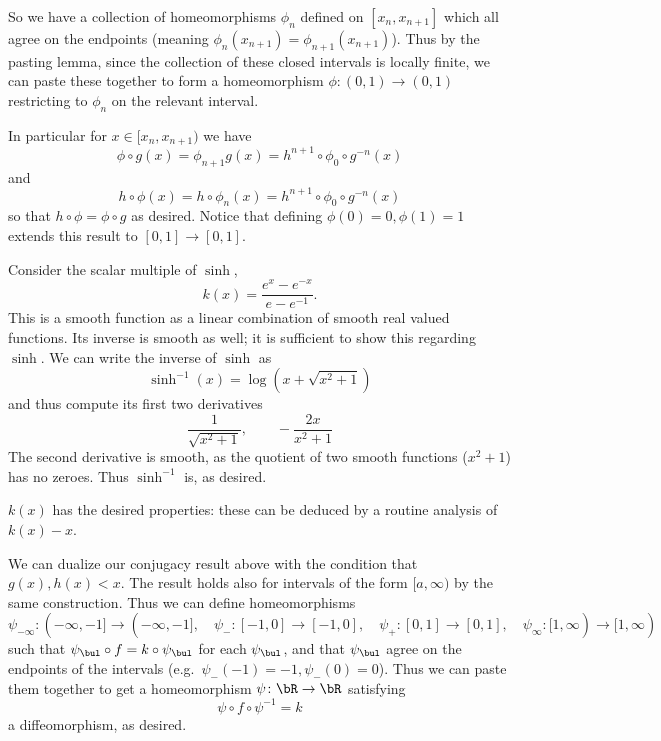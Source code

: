     So we have a collection of homeomorphisms $\phi_n$ defined on $[x_n,x_{n+1}]$ which all agree on the
    endpoints (meaning $\phi_n(x_{n+1})=\phi_{n+1}(x_{n+1})$).
    Thus by the pasting lemma, since the collection of these closed intervals is locally finite, we can
    paste these together to form a homeomorphism $\phi\colon(0,1)\to(0,1)$ restricting to $\phi_n$ on the
    relevant interval.

    In particular for $x\in[x_n,x_{n+1})$ we have
    $$ \phi\circ g(x) = \phi_{n+1} g(x) = h^{n+1}\circ\phi_0\circ g^{-n}(x) $$
    and
    $$ h\circ\phi(x) = h\circ\phi_n(x) = h^{n+1}\circ\phi_0\circ g^{-n}(x) $$
    so that $h\circ\phi=\phi\circ g$ as desired.
    Notice that defining $\phi(0)=0,\phi(1)=1$ extends this result to $[0,1]\to[0,1]$.

    \item Consider the scalar multiple of $\sinh$,
    $$ k(x) = \frac{e^x-e^{-x}}{e-e^{-1}} . $$
    This is a smooth function as a linear combination of smooth real valued functions.
    Its inverse is smooth as well; it is sufficient to show this regarding $\sinh$.
    We can write the inverse of $\sinh$ as
    $$ \sinh^{-1}(x) = \log(x+\sqrt{x^2+1}) $$
    and thus compute its first two derivatives
    $$ \frac1{\sqrt{x^2+1}},\qquad -\frac{2x}{x^2+1} $$
    The second derivative is smooth, as the quotient of two smooth functions ($x^2+1$) has no zeroes.
    Thus $\sinh^{-1}$ is, as desired.

    $k(x)$ has the desired properties: these can be deduced by a routine analysis of $k(x)-x$.

    \item We can dualize our conjugacy result above with the condition that $g(x),h(x)<x$.
    The result holds also for intervals of the form $[a,\infty)$ by the same construction.
    Thus we can define homeomorphisms
    $$ \psi_{-\infty}\colon(-\infty,-1]\to(-\infty,-1],\quad\psi_-\colon[-1,0]\to[-1,0],\quad
    \psi_+\colon[0,1]\to[0,1],\quad\psi_\infty\colon[1,\infty)\to[1,\infty) $$
    such that $\psi_\bul\circ f=k\circ\psi_\bul$ for each $\psi_\bul$, and that $\psi_\bul$
    agree on the endpoints of the intervals (e.g.\ $\psi_-(-1)=-1,\psi_-(0)=0$).
    Thus we can paste them together to get a homeomorphism $\psi\colon\bR\to\bR$ satisfying
    $$ \psi\circ f\circ\psi^{-1} = k $$
    a diffeomorphism, as desired.
\eenum

\bprob

